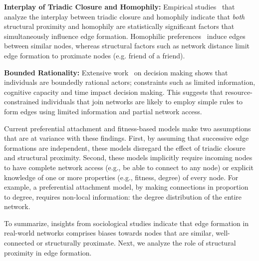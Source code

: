 \textbf{Interplay of Triadic Closure and Homophily:}
Empirical studies~\cite{35626,block2014multidimensional} that analyze the
interplay between triadic closure and homophily
  indicate
that \textit{both} structural proximity and homophily are statistically
significant factors that simultaneously influence edge formation.
Homophilic preferences~\cite{mcpherson2001birds} induce edges between similar
nodes, whereas structural factors such as network distance limit
edge formation to proximate nodes (e.g. friend of a
friend).

\textbf{Bounded Rationality:}
Extensive work~\cite{simon1972theories,gigerenzer1996reasoning,lipman1995information} on
decision making shows that individuals are boundedly rational
actors; constraints such as limited information, cognitive capacity and time impact decision making.
This suggests that resource-constrained individuals that join networks are likely to employ simple rules
to form edges using limited information and partial network access.

Current preferential attachment and fitness-based models
\cite{dorogovtsev2000structure,singh2017relay,barabasi1999emergence}
make two assumptions that are at variance with these findings.
First, by assuming that successive edge formations are independent,
these models disregard the effect of triadic closure and structural proximity.
Second, these models implicitly require incoming nodes to have complete network
access (e.g., be able to connect to any node) or explicit knowledge of one or
more properties (e.g., fitness, degree) of every node. For
example, a preferential attachment model, by making connections in proportion to
degree, requires non-local information: the degree distribution of the entire
network.

To summarize, insights from sociological studies indicate that edge formation in real-world
networks comprises biases towards nodes that are similar, well-connected or
structurally proximate. Next, we analyze the role of structural proximity in edge
formation.

